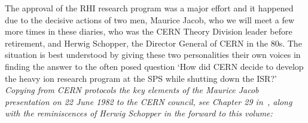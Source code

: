 The approval of the RHI research program was a major effort and it happened due to the decisive actions of two men, Maurice Jacob, who we will meet a few more times in these diaries, who was the CERN Theory Division leader before retirement, and Herwig Schopper, the Director General of CERN in the 80s. The situation is best understood by giving these two personalities their own voices in finding the answer to the often posed question \lq How did CERN decide to develop the heavy ion research program at the SPS while shutting down the ISR?\rq\\

\noindent \textit{Copying from CERN protocols the key elements of the Maurice Jacob presentation on 22 June 1982 to the CERN council, see Chapter 29 in~\cite{Rafelski:2016hnq}, along with the reminiscences of Herwig Schopper in the forward to this volume:}\\[-0.7cm]
%
